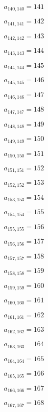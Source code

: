 \documentclass[a4paper,12pt]{article}
\begin{document}
$a _{ 140, 140 } = 141$

$a _{ 141, 141 } = 142$

$a _{ 142, 142 } = 143$

$a _{ 143, 143 } = 144$

$a _{ 144, 144 } = 145$

$a _{ 145, 145 } = 146$

$a _{ 146, 146 } = 147$

$a _{ 147, 147 } = 148$

$a _{ 148, 148 } = 149$

$a _{ 149, 149 } = 150$

$a _{ 150, 150 } = 151$

$a _{ 151, 151 } = 152$

$a _{ 152, 152 } = 153$

$a _{ 153, 153 } = 154$

$a _{ 154, 154 } = 155$

$a _{ 155, 155 } = 156$

$a _{ 156, 156 } = 157$

$a _{ 157, 157 } = 158$

$a _{ 158, 158 } = 159$

$a _{ 159, 159 } = 160$

$a _{ 160, 160 } = 161$

$a _{ 161, 161 } = 162$

$a _{ 162, 162 } = 163$

$a _{ 163, 163 } = 164$

$a _{ 164, 164 } = 165$

$a _{ 165, 165 } = 166$

$a _{ 166, 166 } = 167$

$a _{ 167, 167 } = 168$
\end{document}
